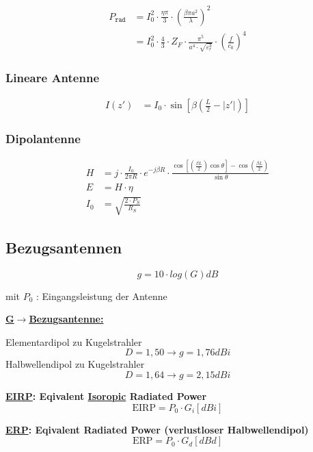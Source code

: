 \begin{align*}
    P_\texttt{rad} & = I_0^2\cdot\frac{\eta\pi}{3}\cdot\left(\frac{\beta\pi a^2}{\lambda}\right)^2                                      \\
                   & = I_0^2\cdot\frac{4}{3}\cdot Z_F\cdot\frac{\pi^5}{a^4\cdot\sqrt{\varepsilon_r^3}}\cdot\left(\frac{f}{c_0}\right)^4
\end{align*}

\subsubsection{Lineare Antenne}
\begin{align*}
    I(z') & = I_0\cdot\sin\left[\beta\left(\frac{L}{2}-|z'|\right)\right]
\end{align*}

\subsubsection{Dipolantenne}
\begin{align*}
    H   & = j\cdot\frac{I_0}{2\pi R}\cdot e^{-j\beta R}\cdot\frac{\cos\left[\left(\frac{\beta L}{2}\right)\cos\theta\right]-\cos\left(\frac{\beta L}{2}\right)}{\sin\theta} \\
    E   & = H\cdot\eta                                                                                                                                                      \\
    I_0 & = \sqrt{\frac{2\cdot P_{S}}{R_S}}
\end{align*}

\subsection{Bezugsantennen}
\[
    \boxed{g = 10 \cdot log(G) \si{dB}}
\]

mit $P_0$ : Eingangsleistung der Antenne

\begin{description}
    \item \textbf{\underline{G$\rightarrow$Bezugsantenne:}}

          Elementardipol  zu Kugelstrahler \[D = 1,50 \rightarrow g = 1,76\si{dBi}\]
          Halbwellendipol zu Kugelstrahler \[D = 1,64 \rightarrow g = 2,15\si{dBi}\]

    \item \textbf{\underline{EIRP}: Eqivalent \underline{Isoropic} Radiated Power}
          \[
              \text{EIRP} = P_0 \cdot G_i [\si{dBi}]
          \]

    \item \textbf{\underline{ERP}: Eqivalent Radiated Power (verlustloser Halbwellendipol)}
          \[
              \text{ERP} = P_0 \cdot G_d [\si{dBd}]
          \]
\end{description}

